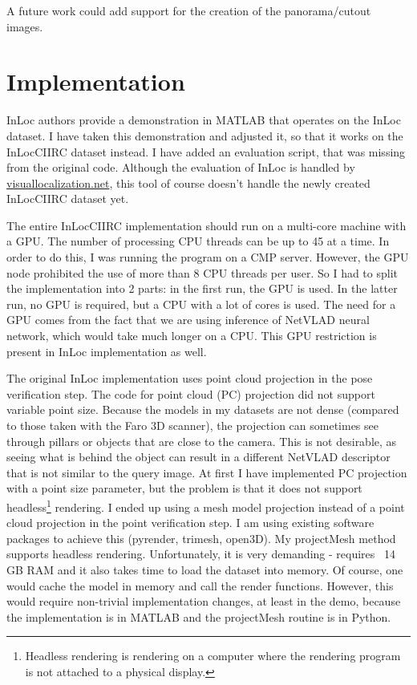 \documentclass[twoside]{ctuthesis}
\theoremstyle{plain}
\theoremstyle{definition}
\theoremstyle{note}
\begin{document}
A future work could add support for the creation of the panorama/cutout images.

\chapter{Implementation}
\label{chapter:implementation}

InLoc \cite{taira2018inloc} authors provide a demonstration in MATLAB that operates on the InLoc dataset. I have taken this demonstration and adjusted it, so that it works on the InLocCIIRC dataset instead. I have added an evaluation script, that was missing from the original code. Although the evaluation of InLoc is handled by \url{visuallocalization.net}, this tool of course doesn't handle the newly created InLocCIIRC dataset yet.

The entire InLocCIIRC implementation should run on a multi-core machine with a GPU. The number of processing CPU threads can be up to 45 at a time. In order to do this, I was running the program on a CMP server. However, the GPU node prohibited the use of more than 8 CPU threads per user. So I had to split the implementation into 2 parts: in the first run, the GPU is used. In the latter run, no GPU is required, but a CPU with a lot of cores is used. The need for a GPU comes from the fact that we are using inference of NetVLAD neural network, which would take much longer on a CPU. This GPU restriction is present in InLoc implementation as well.

The original InLoc implementation uses point cloud projection in the pose verification step. The code for point cloud (PC) projection did not support variable point size. Because the models in my datasets are not dense (compared to those taken with the Faro 3D scanner), the projection can sometimes see through pillars or objects that are close to the camera. This is not desirable, as seeing what is behind the object can result in a different NetVLAD descriptor that is not similar to the query image. At first I have implemented PC projection with a point size parameter, but the problem is that it does not support headless\footnote{Headless rendering is rendering on a computer where the rendering program is not attached to a physical display.} rendering. I ended up using a mesh model projection instead of a point cloud projection in the point verification step. I am using existing software packages to achieve this (pyrender, trimesh, open3D). My projectMesh method supports headless rendering. Unfortunately, it is very demanding - requires ~14 GB RAM and it also takes time to load the dataset into memory. Of course, one would cache the model in memory and call the render functions. However, this would require non-trivial implementation changes, at least in the demo, because the implementation is in MATLAB and the projectMesh routine is in Python.
\end{document}
